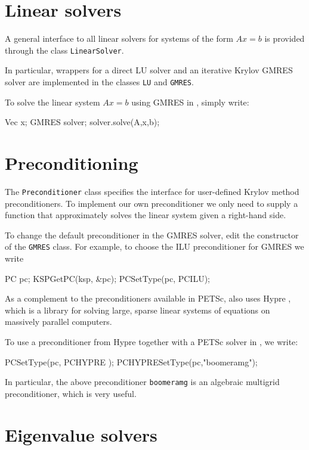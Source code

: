 \section{Linear solvers}

A general interface to all linear solvers for systems of the form 
$Ax=b$ is provided through the class \texttt{LinearSolver}. 

In particular, wrappers for a direct LU solver and an iterative 
Krylov GMRES solver are implemented in the classes \texttt{LU} and \texttt{GMRES}. 

To solve the linear system $Ax=b$ using GMRES in \dolfin{}, simply write:  
%
\begin{code} 
Vec x;
GMRES solver; 
solver.solve(A,x,b);
\end{code} 
%


\section{Preconditioning}

The \texttt{Preconditioner} class specifies the interface for user-defined 
Krylov method preconditioners. To implement our own preconditioner we only 
need to supply a function that approximately solves the linear system given 
a right-hand side.

To change the default preconditioner in the \dolfin{} GMRES solver, edit the 
constructor of the \texttt{GMRES} class. For example, to choose the 
ILU preconditioner for GMRES we write 
%
\begin{code}
PC pc;
KSPGetPC(ksp, &pc);
PCSetType(pc, PCILU);
\end{code}

As a complement to the preconditioners available in PETSc, 
\dolfin{} also uses Hypre \cite{www:hypre}, which is a 
library for solving large, sparse linear systems of equations on 
massively parallel computers. 

To use a preconditioner from Hypre together with a PETSc solver in \dolfin{}, we write:  
%
\begin{code}
PCSetType(pc, PCHYPRE );
PCHYPRESetType(pc,"boomeramg");
\end{code}

In particular, the above preconditioner \texttt{boomeramg} is an algebraic multigrid 
preconditioner, which is very useful. 


\section{Eigenvalue solvers}

